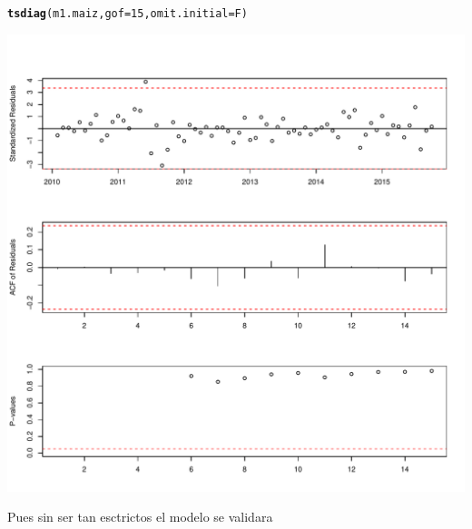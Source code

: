 \documentclass{article}\usepackage[]{graphicx}\usepackage[]{color}
\makeatletter
\def\maxwidth{ %
  \ifdim\Gin@nat@width>\linewidth
    \linewidth
  \else
    \Gin@nat@width
  \fi
}
\newcommand{\hlnum}[1]{\textcolor[rgb]{0.686,0.059,0.569}{#1}}%
\newcommand{\hlstd}[1]{\textcolor[rgb]{0.345,0.345,0.345}{#1}}%
\newcommand{\hlkwc}[1]{\textcolor[rgb]{0.333,0.667,0.333}{#1}}%
\newcommand{\hlkwd}[1]{\textcolor[rgb]{0.737,0.353,0.396}{\textbf{#1}}}%
\newenvironment{kframe}{%
 \def\at@end@of@kframe{}%
 \ifinner\ifhmode%
  \def\at@end@of@kframe{\end{minipage}}%
  \begin{minipage}{\columnwidth}%
 \fi\fi%
 \def\FrameCommand##1{\hskip\@totalleftmargin \hskip-\fboxsep
 \colorbox{shadecolor}{##1}\hskip-\fboxsep
     \hskip-\linewidth \hskip-\@totalleftmargin \hskip\columnwidth}%
 \MakeFramed {\advance\hsize-\width
   \@totalleftmargin\z@ \linewidth\hsize
   \@setminipage}}%
 {\par\unskip\endMakeFramed%
 \at@end@of@kframe}
\newenvironment{knitrout}{}{} %
\makeatother
\begin{document}
\begin{knitrout}
\begin{kframe}\begin{alltt}
\hlkwd{tsdiag}\hlstd{(m1.maiz,}\hlkwc{gof}\hlstd{=}\hlnum{15}\hlstd{,}\hlkwc{omit.initial}\hlstd{=F)}
\end{alltt}
\end{kframe}
\includegraphics[width=\maxwidth]{figure/unnamed-chunk-4-4} 

\end{knitrout}

Pues sin ser tan esctrictos el modelo se validara
\end{document}
